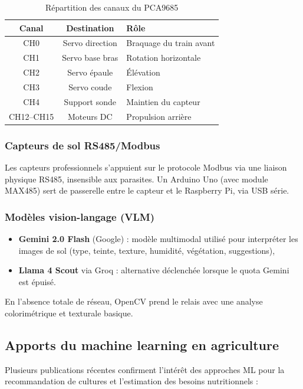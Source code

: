 \documentclass[a4paper,12pt,openany,titlepage]{scrartcl}
\begin{document}
\begin{table}[H]
\centering
\begin{tabular}{|c|c|l|}
\hline
\textbf{Canal} & \textbf{Destination} & \textbf{Rôle} \\
\hline
CH0 & Servo direction & Braquage du train avant \\
CH1 & Servo base bras & Rotation horizontale \\
CH2 & Servo épaule & Élévation \\
CH3 & Servo coude & Flexion \\
CH4 & Support sonde & Maintien du capteur \\
CH12--CH15 & Moteurs DC & Propulsion arrière \\
\hline
\end{tabular}
\caption{Répartition des canaux du PCA9685}
\end{table}

\subsubsection{Capteurs de sol RS485/Modbus}
Les capteurs professionnels s’appuient sur le protocole Modbus via une liaison physique RS485, insensible aux parasites. Un Arduino Uno (avec module MAX485) sert de passerelle entre le capteur et le Raspberry Pi, via USB série.

\subsubsection{Modèles vision-langage (VLM)}
\begin{itemize}[nosep]
    \item \textbf{Gemini 2.0 Flash} (Google) : modèle multimodal utilisé pour interpréter les images de sol (type, teinte, texture, humidité, végétation, suggestions),
    \item \textbf{Llama 4 Scout} via Groq : alternative déclenchée lorsque le quota Gemini est épuisé.
\end{itemize}
En l’absence totale de réseau, OpenCV prend le relais avec une analyse colorimétrique et texturale basique.

\subsection{Apports du machine learning en agriculture}

Plusieurs publications récentes confirment l’intérêt des approches ML pour la recommandation de cultures et l’estimation des besoins nutritionnels :
\end{document}
